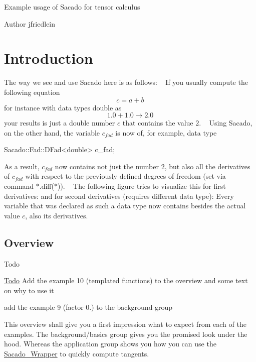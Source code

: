 Example usage of Sacado for tensor calculus\begin{DoxyAuthor}{Author}
jfriedlein
\end{DoxyAuthor}
\hypertarget{index_intro}{}\section{Introduction}\label{index_intro}
The way we see and use Sacado here is as follows\+: ~\newline
If you usually compute the following equation ~\newline
 \[ c = a + b \] for instance with data types double as ~\newline
 \[ 1.0 + 1.0 \rightarrow 2.0 \] your results is just a double number $ c $ that contains the value $ 2 $. ~\newline
 Using Sacado, on the other hand, the variable $ c_{fad} $ is now of, for example, data type 
\begin{DoxyCode}
Sacado::Fad::DFad<double> c\_fad;
\end{DoxyCode}
 As a result, $ c_{fad} $ now contains not just the number $ 2 $, but also all the derivatives of $ c_{fad} $ with respect to the previously defined degrees of freedom (set via command $\ast$.diff($\ast$)). ~\newline
The following figure tries to visualize this for first derivatives\+:  and for second derivatives (requires different data type)\+:  Every variable that was declared as such a data type now contains besides the actual value $ c $, also its derivatives.\hypertarget{index_subsec_overview}{}\subsection{Overview}\label{index_subsec_overview}
\begin{DoxyRefDesc}{Todo}
\item[\hyperlink{todo__todo000001}{Todo}]Add the example 10 (templated functions) to the overview and some text on why to use it 

add the example 9 (factor 0.) to the background group\end{DoxyRefDesc}


This overview shall give you a first impression what to expect from each of the examples. The background/basics group gives you the promised look under the hood. Whereas the application group shows you how you can use the \hyperlink{namespaceSacado__Wrapper}{Sacado\+\_\+\+Wrapper} to quickly compute tangents. 

